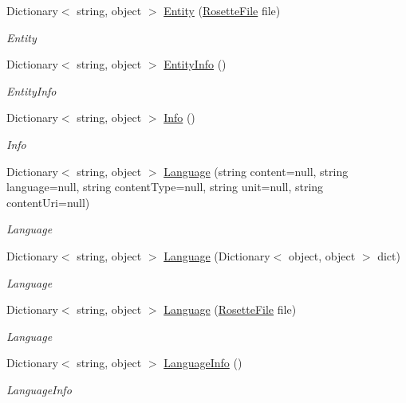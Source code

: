 \begin{DoxyCompactItemize}
Dictionary$<$ string, object $>$ \hyperlink{classrosette__api_1_1_c_a_p_i_a2e38d436ce0cfff05de46671cae7a309}{Entity} (\hyperlink{classrosette__api_1_1_rosette_file}{Rosette\+File} file)
\begin{DoxyCompactList}\small\item\em Entity \end{DoxyCompactList}\item 
Dictionary$<$ string, object $>$ \hyperlink{classrosette__api_1_1_c_a_p_i_ad9bd075aca983e6dbe8b2eed3138f799}{Entity\+Info} ()
\begin{DoxyCompactList}\small\item\em Entity\+Info \end{DoxyCompactList}\item 
Dictionary$<$ string, object $>$ \hyperlink{classrosette__api_1_1_c_a_p_i_a5458accd3534ffc5c594a00bfd63551f}{Info} ()
\begin{DoxyCompactList}\small\item\em Info \end{DoxyCompactList}\item 
Dictionary$<$ string, object $>$ \hyperlink{classrosette__api_1_1_c_a_p_i_a4ed6dffb28f4abed09f7504372f7fc86}{Language} (string content=null, string language=null, string content\+Type=null, string unit=null, string content\+Uri=null)
\begin{DoxyCompactList}\small\item\em Language \end{DoxyCompactList}\item 
Dictionary$<$ string, object $>$ \hyperlink{classrosette__api_1_1_c_a_p_i_a7dc85cad4825942898152996157b0865}{Language} (Dictionary$<$ object, object $>$ dict)
\begin{DoxyCompactList}\small\item\em Language \end{DoxyCompactList}\item 
Dictionary$<$ string, object $>$ \hyperlink{classrosette__api_1_1_c_a_p_i_a83c793fc2f02dfe85b543fa17b061777}{Language} (\hyperlink{classrosette__api_1_1_rosette_file}{Rosette\+File} file)
\begin{DoxyCompactList}\small\item\em Language \end{DoxyCompactList}\item 
Dictionary$<$ string, object $>$ \hyperlink{classrosette__api_1_1_c_a_p_i_a2dcf183afd4f5b7511a17efa5c42ffda}{Language\+Info} ()
\begin{DoxyCompactList}\small\item\em Language\+Info \end{DoxyCompactList}\item 

\end{DoxyCompactItemize}
